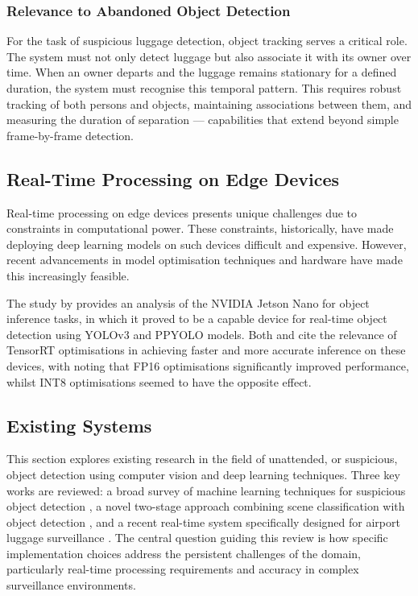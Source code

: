 \subsubsection{Relevance to Abandoned Object Detection}

For the task of suspicious luggage detection, object tracking serves a critical
role. The system must not only detect luggage but also associate it with its
owner over time. When an owner departs and the luggage remains stationary for a
defined duration, the system must recognise this temporal pattern. This
requires robust tracking of both persons and objects, maintaining associations
between them, and measuring the duration of separation --- capabilities that
extend beyond simple frame-by-frame detection.

\subsection{Real-Time Processing on Edge Devices}
\label{sec:real_time_processing_on_edge_devices}

Real-time processing on edge devices presents unique challenges due to
constraints in computational power. These constraints, historically, have made
deploying deep learning models on such devices difficult and expensive.
However, recent advancements in model optimisation techniques and hardware have
made this increasingly feasible.

The study by \citet{zhu2022performance} provides an analysis of the NVIDIA
Jetson Nano for object inference tasks, in which it proved to be a capable
device for real-time object detection using YOLOv3 and PPYOLO models. Both
\citet{zhu2022performance} and \citet{adewumi2025assessing} cite the relevance
of TensorRT optimisations in achieving faster and more accurate inference on
these devices, with \citeauthor{adewumi2025assessing} noting that FP16
optimisations significantly improved performance, whilst INT8 optimisations
seemed to have the opposite effect.

\subsection{Existing Systems}

This section explores existing research in the field of unattended, or
suspicious, object detection using computer vision and deep learning
techniques. Three key works are reviewed: a broad survey of machine learning
techniques for suspicious object detection \citep{dubey2024critical}, a novel
two-stage approach combining scene classification with object detection
\citep{qasim2024abandoned}, and a recent real-time system specifically designed
for airport luggage surveillance \citep{abandoned2025vrsalovic}. The central
question guiding this review is how specific implementation choices address the
persistent challenges of the domain, particularly real-time processing
requirements and accuracy in complex surveillance environments.

